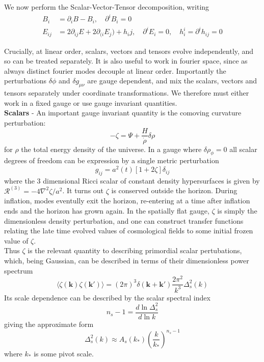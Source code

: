 \documentclass[a4paper,10pt]{article}
\renewcommand{\v}[1]{\mathbf{#1}}
\begin{document}
We now perform the Scalar-Vector-Tensor decomposition, writing
\begin{align}
B_i &= \partial_i B - B_i, \quad \partial^iB_i=0\\
E_{ij} &= 2\partial_{ij}E + 2\partial_{(i}E_{j}) + h_ij, \quad \partial^iE_i=0, \quad h^i_i = \partial^ih_{ij}=0
\end{align}

Crucially, at linear order, scalars, vectors and tensors evolve independently, and so can be treated separately. It is also useful to work in fourier space, since as always distinct fourier modes decouple at linear order. Importantly the perturbations $\delta\phi$ and $\delta g_{\mu\nu}$ are gauge dependent, and mix the scalars, vectors and tensors separately under coordinate transformations. We therefore must either work in a fixed gauge or use gauge invariant quantities.\\

\textbf{Scalars} - An important gauge invariant quantity is the comoving curvature perturbation:
\begin{equation}
-\zeta = \Psi + \frac{H}{\dot\rho}\delta{\rho} 
\label{zeta}
\end{equation}
for $\rho$ the total energy density of the universe. In a gauge where $\delta{\rho}_\phi = 0$ all scalar degrees of freedom can be expression by a single metric perturbation 
\begin{equation}
g_{ij} = a^2(t)[1+2\zeta]\delta_{ij}
\end{equation}
where the 3 dimensional Ricci scalar of constant density hypersurfaces is given by $\mathcal{R}^{(3)} = -4\nabla^2\zeta / a^2$. It turns out $\zeta$ is conserved outside the horizon. During inflation, modes eventully exit the horizon, re-entering at a time after inflation ends and the horizon has grown again. In the spatially flat gauge, $\zeta$ is simply the dimensionless density perturbation, and one can construct transfer functions relating the late time evolved values of cosmological fields to some initial frozen value of $\zeta$. \\
Thus $\zeta$ is the relevant quantity to describing primordial scalar pertubations, which, being Gaussian, can be described in terms of their dimensionless power spectrum
\begin{equation}
\langle \zeta(\v{k})\zeta(\v{k'}) \rangle=(2\pi)^3\delta(\v{k}+\v{k'})\frac{2\pi^2}{k^3}\Delta^2_s(k)
\end{equation}
Its scale dependence can be described by the scalar spectral index
\begin{equation}
n_s-1 = \frac{d\ln{\Delta^2_s}}{d\ln{k}}
\end{equation}
giving the approximate form 
\begin{equation}
\Delta^2_s(k) \approx A_s(k_*)(\frac{k}{k_*})^{n_s-1} 
\end{equation}
where $k_*$ is some pivot scale. \\
\end{document}
